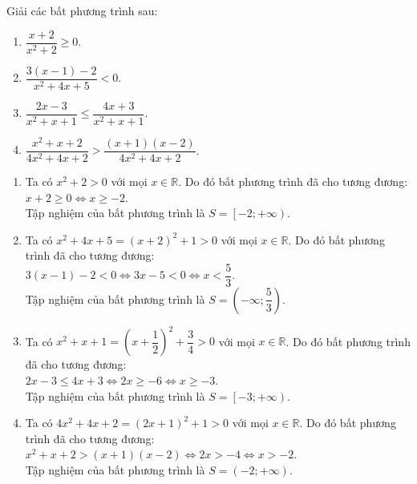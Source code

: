 \begin{bt}%
	Giải các bất phương trình sau:
	\begin{multicols}{2}
		\begin{enumerate}
			\item $\dfrac{x+2}{x^2+2} \geq 0$.
			\item $\dfrac{3(x-1)-2}{x^2+4x+5} <0$.
			\item $\dfrac{2x-3}{x^2+x+1} \leq \dfrac{4x + 3}{x^2+x+1}$.
			\item $\dfrac{x^2+x+2}{4x^2+4x+2} > \dfrac{(x+1)(x-2)}{4x^2+4x+2}$.
		\end{enumerate}
	\end{multicols}
	\loigiai
	{
		\begin{enumerate}
			\item Ta có $x^2 + 2 >0$ với mọi $x \in \mathbb{R}$. Do đó bất phương trình đã cho tương đương:\\
			$x + 2 \geq 0 \Leftrightarrow x \geq -2$.\\
			Tập nghiệm của bất phương trình là $S=\left[-2;+\infty\right)$.
			
			\item Ta có $x^2+4x+5 = (x+2)^2 + 1 >0$ với mọi $x \in \mathbb{R}$. Do đó bất phương trình đã cho tương đương:\\
			$3(x-1)-2 < 0 \Leftrightarrow 3x -5 < 0 \Leftrightarrow x < \dfrac{5}{3}$.\\
			Tập nghiệm của bất phương trình là $S=\left(-\infty; \dfrac{5}{3} \right)$.
			
			\item Ta có $x^2+x+1 = \left(x + \dfrac{1}{2}\right)^2 + \dfrac{3}{4}>0$ với mọi $x \in \mathbb{R}$. Do đó bất phương trình đã cho tương đương:\\
			$2x-3 \leq 4x+3 \Leftrightarrow 2x \geq -6 \Leftrightarrow x \geq -3$.\\
			Tập nghiệm của bất phương trình là $S=\left[-3;+\infty\right)$.
			
			\item Ta có $4x^2+4x+2 = \left(2x + 1\right)^2 + 1>0$ với mọi $x \in \mathbb{R}$. Do đó bất phương trình đã cho tương đương:\\
			$x^2+x+2 > (x+1)(x-2) \Leftrightarrow 2x > -4 \Leftrightarrow x > -2$.\\
			Tập nghiệm của bất phương trình là $S=\left(-2;+\infty\right)$.
		\end{enumerate}
	}
\end{bt}



